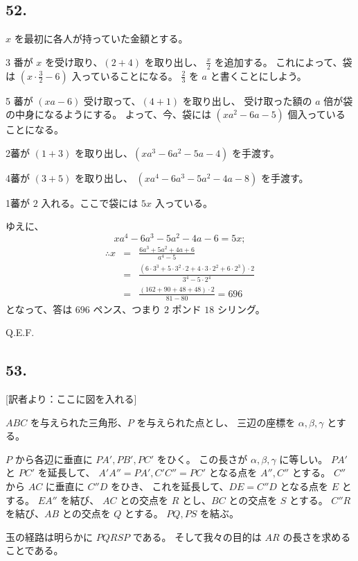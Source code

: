 \subsection*{52.}

$x$ を最初に各人が持っていた金額とする。

3 番が $x$ を受け取り、$(2 + 4)$ を取り出し、
$\frac{x}{2}$ を追加する。
これによって、袋は $(x \cdot \frac{3}{2} - 6)$ 入っていることになる。
$\frac{2}{3}$ を $a$ と書くことにしよう。

5 蕃が $(xa - 6)$ 受け取って、$(4 + 1)$ を取り出し、
受け取った額の $a$ 倍が袋の中身になるようにする。
よって、今、袋には $(xa^2 - 6a - 5)$ 個入っていることになる。

2蕃が $(1 + 3)$ を取り出し、$(xa^3 - 6 a^2 - 5a - 4)$
を手渡す。

4蕃が $(3 + 5)$ を取り出し、
$(xa^4 - 6a^3 - 5a^2 - 4a -8)$ を手渡す。

1蕃が $2$ 入れる。ここで袋には $5x$ 入っている。

ゆえに、
\[
xa^4 - 6a^3 - 5a^2 - 4a -6 = 5x;
\]
\begin{eqnarray*}
\therefore
x &=& \frac{6a^3 + 5a^2 + 4a + 6}{a^4 - 5}\\
&=&
\frac{(6\cdot 3^3 + 5\cdot 3^2 \cdot 2 + 4 \cdot 3 \cdot 2^2 + 6 \cdot 2^3) \cdot 2}{3^4 - 5\cdot 2^4}\\
&=&
\frac{(162 + 90 + 48 + 48)\cdot 2}{81 - 80}
= 696
\end{eqnarray*}
となって、答は $696$ ペンス、つまり $2$ ポンド $18$ シリング。

Q.E.F.

\subsection*{53.}

[訳者より：ここに図を入れる] 

$ABC$ を与えられた三角形、$P$ を与えられた点とし、
三辺の座標を $\alpha, \beta, \gamma$ とする。

$P$ から各辺に垂直に $PA', PB', PC'$ をひく。
この長さが $\alpha, \beta, \gamma$ に等しい。
$PA'$ と $PC'$ を延長して、
$A'A'' = PA', C'C'' = PC'$ となる点を $A'', C''$ とする。
$C''$ から $AC$ に垂直に $C''D$ をひき、
これを延長して、$DE = C''D$ となる点を $E$ とする。
$EA''$ を結び、
$AC$ との交点を $R$ とし、$BC$ との交点を $S$ とする。
$C''R$ を結び、$AB$ との交点を $Q$ とする。
$PQ, PS$ を結ぶ。

玉の経路は明らかに $PQRSP$ である。
そして我々の目的は $AR$ の長さを求めることである。

